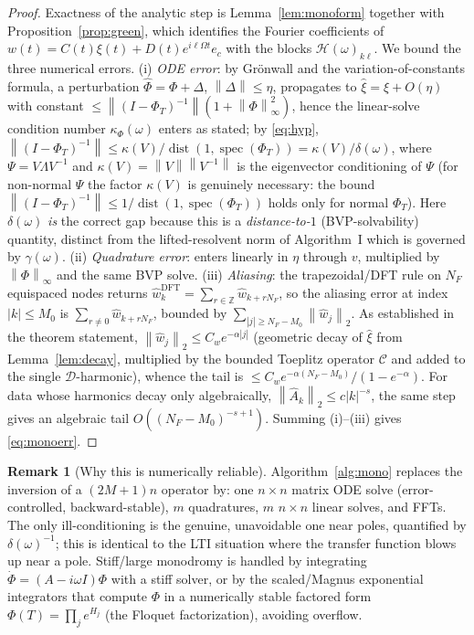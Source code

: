 \documentclass{amsart}
\theoremstyle{definition}
\newtheorem{remark}{Remark}
\DeclareMathOperator{\spec}{spec}
\DeclareMathOperator{\dist}{dist}
\newcommand{\Z}{\mathbb{Z}}
\newcommand{\norm}[1]{\left\lVert#1\right\rVert}
\newcommand{\Ccal}{\mathcal{C}}
\newcommand{\Dcal}{\mathcal{D}}
\newcommand{\Hcal}{\mathcal{H}}
\begin{document}
\begin{proof}
Exactness of the analytic step is Lemma~\ref{lem:monoform} together with
Proposition~\ref{prop:green}, which identifies the Fourier coefficients of
$w(t)=C(t)\xi(t)+D(t)e^{i\ell\Omega t}e_c$ with the blocks
$\Hcal(\omega)_{k\ell}$. We bound the three numerical errors. (i) \emph{ODE
error}: by Gr\"onwall and the variation-of-constants formula, a perturbation
$\hat\Phi=\Phi+\Delta$, $\norm\Delta\le\eta$, propagates to
$\hat\xi=\xi+O(\eta)$ with constant
$\le \norm{(I-\Phi_T)^{-1}}(1+\norm{\Phi}_\infty^2)$, hence the linear-solve
condition number $\kappa_\Phi(\omega)$ enters as stated; by \eqref{eq:hyp},
$\norm{(I-\Phi_T)^{-1}}\le \kappa(V)/\dist(1,\spec(\Phi_T))=
\kappa(V)/\delta(\omega)$, where $\Psi=V\Lambda V^{-1}$ and
$\kappa(V)=\norm V\norm{V^{-1}}$ is the eigenvector conditioning of $\Psi$
(for non-normal $\Psi$ the factor $\kappa(V)$ is genuinely necessary: the bound
$\norm{(I-\Phi_T)^{-1}}\le 1/\dist(1,\spec(\Phi_T))$ holds only for normal
$\Phi_T$). Here $\delta(\omega)$ \emph{is} the correct gap because this is a
\emph{distance-to-$1$} (BVP-solvability) quantity, distinct from the
lifted-resolvent norm of Algorithm~I which is governed by $\gamma(\omega)$. (ii) \emph{Quadrature error}: enters linearly in $\eta$
through $v$, multiplied by $\norm{\Phi}_\infty$ and the same BVP solve. (iii)
\emph{Aliasing}: the trapezoidal/DFT rule on $N_F$ equispaced nodes
returns $\widehat w_k^{\mathrm{DFT}}=\sum_{r\in\Z}\hat w_{k+rN_F}$, so the
aliasing error at index $|k|\le M_0$ is $\sum_{r\ne0}\hat w_{k+rN_F}$, bounded by
$\sum_{|j|\ge N_F-M_0}\norm{\hat w_j}_2$. As established in the theorem statement,
$\norm{\hat w_j}_2\le C_w e^{-\alpha|j|}$ (geometric decay of $\hat\xi$ from
Lemma~\ref{lem:decay}, multiplied by the bounded Toeplitz operator $\Ccal$ and
added to the single $\Dcal$-harmonic), whence the tail is
$\le C_w e^{-\alpha(N_F-M_0)}/(1-e^{-\alpha})$. For data whose harmonics decay
only algebraically, $\norm{\hat A_k}_2\le c|k|^{-s}$, the same step gives an
algebraic tail $O((N_F-M_0)^{-s+1})$. Summing (i)--(iii) gives
\eqref{eq:monoerr}.
\end{proof}

\begin{remark}[Why this is numerically reliable]
Algorithm~\ref{alg:mono} replaces the inversion of a $(2M{+}1)n$ operator by:
one $n\times n$ matrix ODE solve (error-controlled, backward-stable), $m$
quadratures, $m$ $n\times n$ linear solves, and FFTs. The only ill-conditioning
is the genuine, unavoidable one near poles, quantified by $\delta(\omega)^{-1}$;
this is identical to the LTI situation where the transfer function blows up near
a pole. Stiff/large monodromy is handled by integrating $\dot\Phi=(A-i\omega
I)\Phi$ with a stiff solver, or by the scaled/Magnus exponential integrators
that compute $\Phi$ in a numerically stable factored form
$\Phi(T)=\prod_j e^{H_j}$ (the Floquet factorization), avoiding overflow.
\end{remark}
\end{document}
